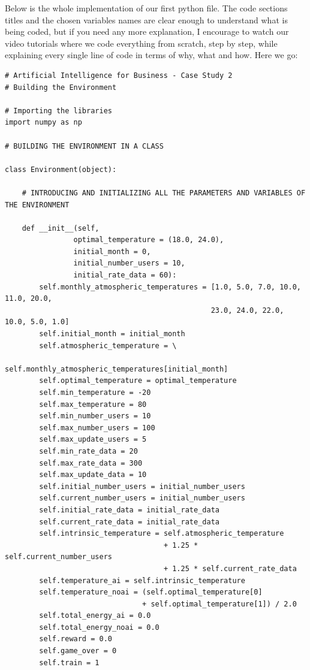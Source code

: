 \documentclass[]{book}
\begin{document}
Below is the whole implementation of our first python file. The code sections titles and the chosen variables names are clear enough to understand what is being coded, but if you need any more explanation, I encourage to watch our video tutorials where we code everything from scratch, step by step, while explaining every single line of code in terms of why, what and how. Here we go:

\begin{lstlisting}
# Artificial Intelligence for Business - Case Study 2
# Building the Environment

# Importing the libraries
import numpy as np

# BUILDING THE ENVIRONMENT IN A CLASS

class Environment(object):
    
    # INTRODUCING AND INITIALIZING ALL THE PARAMETERS AND VARIABLES OF THE ENVIRONMENT
    
    def __init__(self,
                optimal_temperature = (18.0, 24.0),
                initial_month = 0,
                initial_number_users = 10,
                initial_rate_data = 60):
        self.monthly_atmospheric_temperatures = [1.0, 5.0, 7.0, 10.0, 11.0, 20.0,
                                                23.0, 24.0, 22.0, 10.0, 5.0, 1.0]
        self.initial_month = initial_month
        self.atmospheric_temperature = \
                                self.monthly_atmospheric_temperatures[initial_month]
        self.optimal_temperature = optimal_temperature
        self.min_temperature = -20
        self.max_temperature = 80
        self.min_number_users = 10
        self.max_number_users = 100
        self.max_update_users = 5
        self.min_rate_data = 20
        self.max_rate_data = 300
        self.max_update_data = 10
        self.initial_number_users = initial_number_users
        self.current_number_users = initial_number_users
        self.initial_rate_data = initial_rate_data
        self.current_rate_data = initial_rate_data
        self.intrinsic_temperature = self.atmospheric_temperature
                                     + 1.25 * self.current_number_users
                                     + 1.25 * self.current_rate_data
        self.temperature_ai = self.intrinsic_temperature
        self.temperature_noai = (self.optimal_temperature[0]
                                + self.optimal_temperature[1]) / 2.0
        self.total_energy_ai = 0.0
        self.total_energy_noai = 0.0
        self.reward = 0.0
        self.game_over = 0
        self.train = 1



\end{lstlisting}
\end{document}
